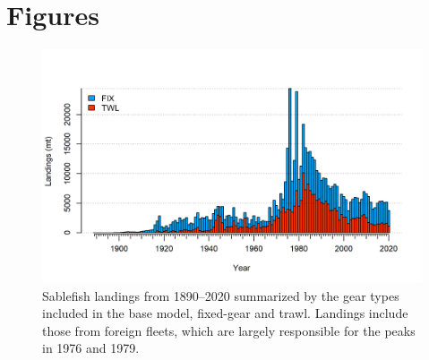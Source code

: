 \documentclass[11pt,
  english,
  a4paper,
]{article}
\begin{document}
\leavevmode\tagmcend\tagstructend\par
\endgroup{}
\endgroup{}

\clearpage


\hypertarget{figures}{%
\section{Figures}\label{figures}}

\leavevmode\tagmcend\tagstructend


\begin{figure}
\centering
\includegraphics[width=1\textwidth,height=1\textheight]{figs/catch2 landings stacked.png}
\caption{Sablefish landings from 1890--2020 summarized by the gear types included in the base model, fixed-gear and trawl. Landings include those from foreign fleets, which are largely responsible for the peaks in 1976 and 1979.\label{fig:removals}}
\end{figure}

\tagmcend\tagstructend

\end{document}
